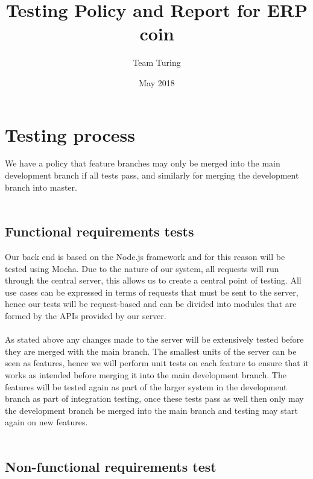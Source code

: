 \documentclass{article}
\title{Testing Policy and Report for ERP coin}
\author{Team Turing}
\date{May 2018}
\begin{document}
\maketitle
\section{Testing process}
We have a policy that feature branches may only be merged into the main development branch if all tests pass, and similarly for merging the development branch into master. 
\\ \\
\subsection*{Functional requirements tests}
Our back end is based on the Node.js framework and for this reason will be tested using Mocha. Due to the nature of our system, all requests will run through the central server, this allows us to create a central point of testing. All use cases can be expressed in terms of requests that must be sent to the server, hence our tests will be request-based and can be divided into modules that are formed by the APIs provided by our server.
\\ \\
As stated above any changes made to the server will be extensively tested before they are merged with the main branch. The smallest units of the server can be seen as features, hence we will perform unit tests on each feature to ensure that it works as intended before merging it into the main development branch. The features will be tested again as part of the larger system in the development branch as part of integration testing, once these tests pass as well then only may the development branch be merged into the main branch and testing may start again on new features.
\\ \\
\subsection*{Non-functional requirements test}
\end{document}
